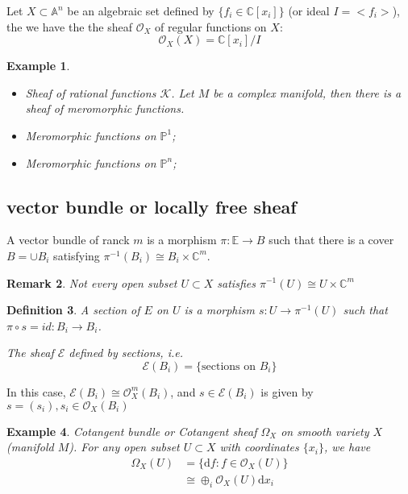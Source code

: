 \documentclass{article}
\newtheorem{defn}{Definition}[section]
\newtheorem{rmk}[defn]{Remark}
\newtheorem{exa}[defn]{Example}
\begin{document}
Let $X \subset \mathbb{A}^{n}$ be an algebraic set defined by $\{f_{i}\in \mathbb{C}[x_{i}]\}$ (or ideal $I=  <f_{i}> $), the we have the the sheaf $\mathcal{O}_{X}$ of regular functions on $X$:
\[
	\mathcal{O}_{X}(X)=\mathbb{C}[x_{i}]/I
\]

\begin{exa}
	\begin{itemize}
		\item Sheaf of rational functions $\mathcal{K}$. Let  $M$ be a complex manifold, then there is a sheaf of meromorphic functions.
		\item Meromorphic functions on $\mathbb{P}^{1}$;
		\item Meromorphic functions on $\mathbb{P}^{n}$;
	\end{itemize}
\end{exa}

\subsection{vector bundle or locally free sheaf}
A vector bundle of ranck $m$ is a morphism $\pi: \mathbb{E}\to B$ such that there is a cover $B=\cup B_{i}$ satisfying $\pi^{-1}(B_{i})\cong B_{i}\times \mathbb{C}^{m}$.
\begin{rmk}
	Not every open subset $U \subset X$ satisfies $\pi^{-1}(U)\cong U\times \mathbb{C}^{m}$
\end{rmk}
\begin{defn}
	A section of $E$ on $U$ is a morphism $s:U \to \pi^{-1}(U)$ such that $\pi \circ s=id: B_{i} \to B_{i}$.

	The sheaf $\mathcal{E}$ defined by sections, i.e.
	\[
		\mathcal{E}(B_{i})=\{\text{sections on }B_{i}\}
	\]
\end{defn}

In this case, $\mathcal{E}(B_{i})\cong \mathcal{O}_{X}^{m}(B_{i})$, and $s\in \mathcal{E}(B_{i})$ is given by $s=(s_{i}), s_{i}\in \mathcal{O}_{X}(B_{i})$

\begin{exa}
	Cotangent bundle or Cotangent sheaf $\Omega_{X}$ on smooth variety $X$ (manifold $M$).
	For any open subset $U \subset X$ with coordinates $\{x_{i}\}$, we have
	\begin{align*}
		\Omega_{X}(U) & = \{\mathrm{d}f: f \in \mathcal{O}_{X}(U)\}         \\
		              & \cong \oplus_{i} \mathcal{O}_{X}(U)\mathrm{d} x_{i}
	\end{align*}


\end{exa}
\end{document}
